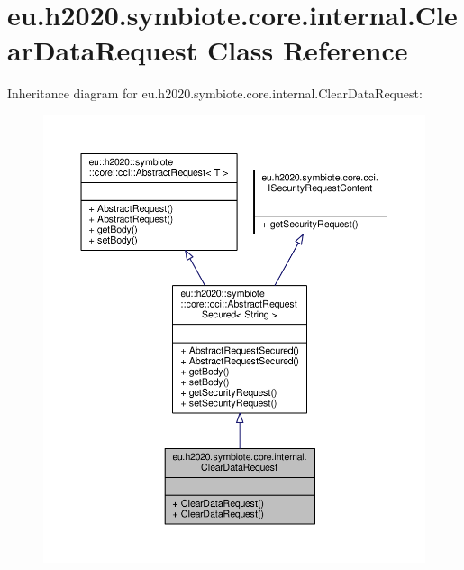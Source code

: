 \hypertarget{classeu_1_1h2020_1_1symbiote_1_1core_1_1internal_1_1ClearDataRequest}{}\section{eu.\+h2020.\+symbiote.\+core.\+internal.\+Clear\+Data\+Request Class Reference}
\label{classeu_1_1h2020_1_1symbiote_1_1core_1_1internal_1_1ClearDataRequest}


Inheritance diagram for eu.\+h2020.\+symbiote.\+core.\+internal.\+Clear\+Data\+Request\+:
\nopagebreak
\begin{figure}[H]
\begin{center}
\leavevmode
\includegraphics[width=350pt]{classeu_1_1h2020_1_1symbiote_1_1core_1_1internal_1_1ClearDataRequest__inherit__graph}
\end{center}
\end{figure}


